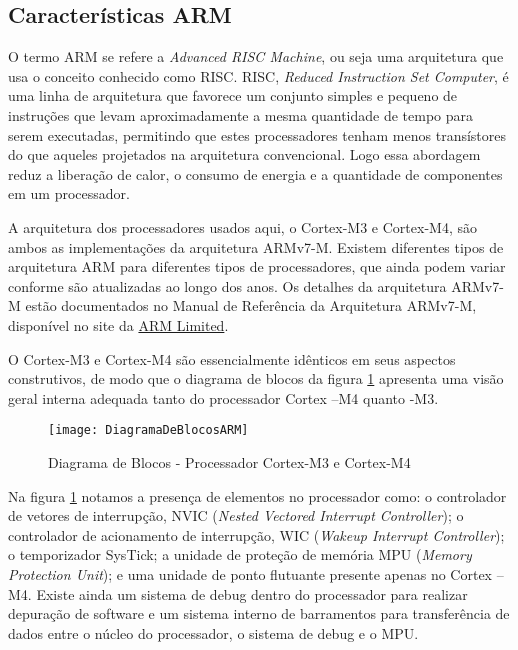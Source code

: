 \subsection{Características ARM}

O termo ARM se refere a \emph{Advanced RISC Machine}, ou seja uma arquitetura que usa o conceito conhecido como RISC. RISC, \emph{Reduced Instruction Set Computer}, é uma linha de arquitetura que favorece um conjunto simples e pequeno de instruções que levam aproximadamente a mesma quantidade de tempo para serem executadas, permitindo que estes processadores tenham menos transístores do que aqueles projetados na arquitetura convencional. Logo essa abordagem reduz a liberação de calor, o consumo de energia e a quantidade de componentes em um processador.

A arquitetura dos processadores usados aqui, o Cortex-M3 e Cortex-M4, são ambos as implementações da arquitetura ARMv7-M. Existem diferentes tipos de arquitetura ARM para diferentes tipos de processadores, que ainda podem variar conforme são atualizadas ao longo dos anos. Os detalhes da arquitetura ARMv7-M estão documentados no Manual de Referência da Arquitetura  ARMv7-M, disponível no site da  \href{http://infocenter.arm.com/help/index.jsp}{ARM Limited}.

O Cortex-M3 e Cortex-M4 são essencialmente idênticos em seus aspectos construtivos, de modo que o diagrama de blocos da figura \ref{DiagramaDeBlocosARM}  apresenta uma visão  geral interna adequada tanto do processador Cortex –M4 quanto -M3.

\begin{figure}[H]
	\centering
	\texttt{[image: DiagramaDeBlocosARM]}
	\caption{Diagrama de Blocos - Processador Cortex-M3 e Cortex-M4 \cite{DATASHEET_TIVA}}
	\label{DiagramaDeBlocosARM}
\end{figure}

Na figura \ref{DiagramaDeBlocosARM} notamos a presença de elementos no processador como:  o controlador de vetores de interrupção, NVIC (\emph{Nested Vectored Interrupt Controller}); o controlador de acionamento de interrupção, WIC (\emph{Wakeup Interrupt Controller}); o temporizador SysTick; a unidade de proteção de memória MPU (\emph{Memory Protection Unit}); e uma unidade de ponto flutuante presente apenas no Cortex –M4. Existe ainda um sistema de debug dentro do processador para realizar depuração de software e um sistema interno de barramentos para transferência de dados entre o núcleo do processador, o sistema de debug e o MPU. 

